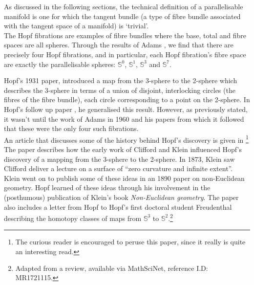 As discussed in the following sections, the technical definition of a parallelisable manifold is one for which the tangent bundle (a type of fibre bundle associated with the tangent space of a manifold) is `trivial'.\\

The Hopf fibrations are examples of fibre bundles where the base, total and fibre spaces are all spheres. Through the results of Adams \cite{MR0141119}, we find that there are precisely four Hopf fibrations, and in particular, each Hopf fibration's fibre space are exactly the parallelisable spheres: $\mathbb{S}^0$, $\mathbb{S}^1$, $\mathbb{S}^3$ and $\mathbb{S}^7$.\\

\pagebreak

Hopf's 1931 paper, \cite{MR1512691} introduced a map from the 3-sphere to the 2-sphere which describes the 3-sphere in terms of a union of disjoint, interlocking circles (the fibres of the fibre bundle), each circle corresponding to a point on the 2-sphere. In Hopf's follow up paper \cite{Hopf1935}, he generalised this result. However, as previously stated, it wasn't until the work of Adams in 1960 and his papers \cite{MR0141119,MR0139178} from which it followed that these were the only four such fibrations.\\


%
An article that discusses some of the history behind Hopf's discovery is given in \cite{MR1721115}\footnote{The curious reader is encouraged to peruse this paper, since it really is quite an interesting read.}
The paper describes how the early work of Clifford and Klein influenced Hopf's discovery of a mapping from the 3-sphere to the 2-sphere. In 1873, Klein saw Clifford deliver a lecture on a surface of ``zero curvature and infinite extent''. Klein went on to publish some of these ideas in an 1890 paper on non-Euclidean geometry. Hopf learned of these ideas through his involvement in the (posthumous) publication of Klein's book \textit{Non-Euclidean geometry}. The paper also includes a letter from Hopf to Hopf’s first doctoral student Freudenthal describing the homotopy classes of maps from $\mathbb{S}^3$ to $\mathbb{S}^2$.\footnote{Adapted from a review, available via MathSciNet, reference I.D: MR1721115.}
\pagebreak

